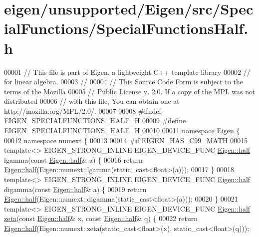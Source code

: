 \hypertarget{eigen_2unsupported_2_eigen_2src_2_special_functions_2_special_functions_half_8h_source}{}\section{eigen/unsupported/\+Eigen/src/\+Special\+Functions/\+Special\+Functions\+Half.h}
\label{eigen_2unsupported_2_eigen_2src_2_special_functions_2_special_functions_half_8h_source}

\begin{DoxyCode}
00001 \textcolor{comment}{// This file is part of Eigen, a lightweight C++ template library}
00002 \textcolor{comment}{// for linear algebra.}
00003 \textcolor{comment}{//}
00004 \textcolor{comment}{// This Source Code Form is subject to the terms of the Mozilla}
00005 \textcolor{comment}{// Public License v. 2.0. If a copy of the MPL was not distributed}
00006 \textcolor{comment}{// with this file, You can obtain one at http://mozilla.org/MPL/2.0/.}
00007 
00008 \textcolor{preprocessor}{#ifndef EIGEN\_SPECIALFUNCTIONS\_HALF\_H}
00009 \textcolor{preprocessor}{#define EIGEN\_SPECIALFUNCTIONS\_HALF\_H}
00010 
00011 \textcolor{keyword}{namespace }\hyperlink{namespace_eigen}{Eigen} \{
00012 \textcolor{keyword}{namespace }numext \{
00013 
00014 \textcolor{preprocessor}{#if EIGEN\_HAS\_C99\_MATH}
00015 \textcolor{keyword}{template}<> EIGEN\_STRONG\_INLINE EIGEN\_DEVICE\_FUNC \hyperlink{struct_eigen_1_1half}{Eigen::half} lgamma(\textcolor{keyword}{const} 
      \hyperlink{struct_eigen_1_1half}{Eigen::half}& a) \{
00016   \textcolor{keywordflow}{return} \hyperlink{struct_eigen_1_1half}{Eigen::half}(Eigen::numext::lgamma(static\_cast<float>(a)));
00017 \}
00018 \textcolor{keyword}{template}<> EIGEN\_STRONG\_INLINE EIGEN\_DEVICE\_FUNC \hyperlink{struct_eigen_1_1half}{Eigen::half} digamma(\textcolor{keyword}{const} 
      \hyperlink{struct_eigen_1_1half}{Eigen::half}& a) \{
00019   \textcolor{keywordflow}{return} \hyperlink{struct_eigen_1_1half}{Eigen::half}(Eigen::numext::digamma(static\_cast<float>(a)));
00020 \}
00021 \textcolor{keyword}{template}<> EIGEN\_STRONG\_INLINE EIGEN\_DEVICE\_FUNC \hyperlink{struct_eigen_1_1half}{Eigen::half} \hyperlink{namespace_eigen_af9555e27540da78d2c4bdd17d3b750b1}{zeta}(\textcolor{keyword}{const} 
      \hyperlink{struct_eigen_1_1half}{Eigen::half}& x, \textcolor{keyword}{const} \hyperlink{struct_eigen_1_1half}{Eigen::half}& q) \{
00022   \textcolor{keywordflow}{return} \hyperlink{struct_eigen_1_1half}{Eigen::half}(Eigen::numext::zeta(static\_cast<float>(x), static\_cast<float>(q)));

\end{DoxyCode}
